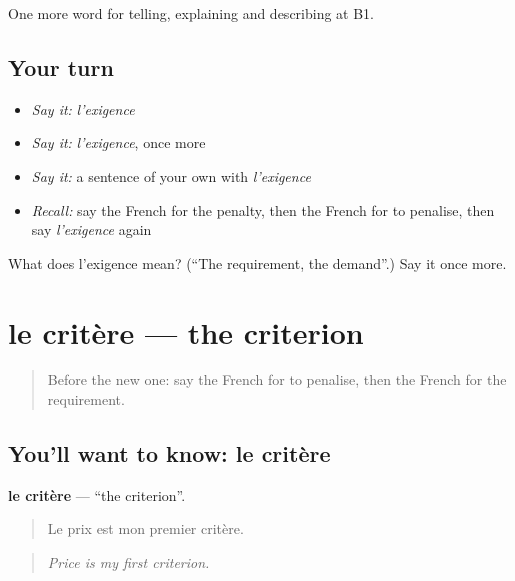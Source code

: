 \begin{grammarlens}[title={What you've built}]
One more word for telling, explaining and describing at B1.
\end{grammarlens}

\subsection*{Your turn}
\begin{itemize}
\raggedright
  \item \emph{Say it:} \emph{l'exigence}
  \item \emph{Say it:} \emph{l'exigence}, once more
  \item \emph{Say it:} a sentence of your own with \emph{l'exigence}
  \item \emph{Recall:} say the French for the penalty, then the French for to penalise, then say \emph{l'exigence} again
\end{itemize}

\begin{tcolorbox}[breakable,colback=teal!4,colframe=teal!35!black,title={Before you move on}]
What does l'exigence mean? (\textquotedblleft{}The requirement, the demand\textquotedblright{}.) Say it once more.
\end{tcolorbox}
\section[le critère]{le critère — the criterion}

\label{lesson:FR-C383-critere}



\begin{quote}
Before the new one: say the French for to penalise, then the French for the requirement.
\end{quote}

\subsection*{You'll want to know: le critère}
\textbf{le critère} — \textquotedblleft{}the criterion\textquotedblright{}.

\begin{quote}
Le prix est mon premier critère.
\end{quote}

\begin{quote}
\emph{Price is my first criterion.}
\end{quote}


